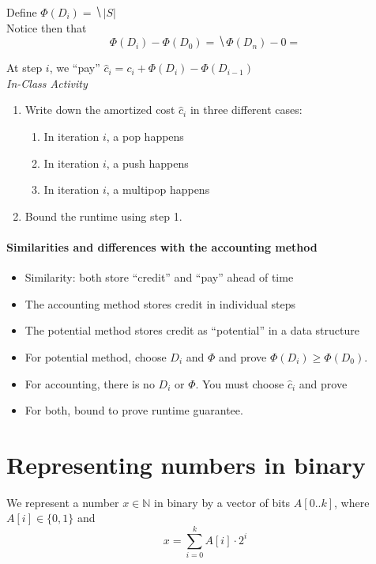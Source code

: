 \documentclass[11  pt]{article}
\begin{document}
Define $\Phi(D_i) = \hide{|S|}$ \\

Notice then that 
$$\Phi(D_i) - \Phi(D_0) =  \hide{\Phi(D_n) - 0 = } $$

At step $i$, we ``pay'' $\hat{c}_i = c_i + \Phi(D_i) - \Phi(D_{i-1})$\\


\emph{In-Class Activity}
\begin{enumerate}
	\item Write down the amortized cost $\hat{c}_i$ in three different cases: 
	\begin{enumerate}
		\item In iteration $i$, a pop happens
		\item In iteration $i$, a push happens
		\item In iteration $i$, a multipop happens
	\end{enumerate}
	\item Bound the runtime using step 1.
\end{enumerate}



\pagebreak
\paragraph{Similarities and differences with the accounting method}
\begin{itemize}
	\item Similarity: both store ``credit'' and ``pay'' ahead of time
	\item The accounting method stores credit in individual steps %
	\item The potential method stores credit as ``potential'' in a data structure
	\item For potential method, choose $D_i$ and $\Phi$ and prove $\Phi(D_i) \geq \Phi(D_0)$. \\
	\item For accounting, there is no $D_i$ or $\Phi$. You must choose $\hat{c}_i$ and prove 
	\item For both, bound  to prove runtime guarantee.
\end{itemize}

\pagebreak

\section{Representing numbers in binary}
We represent a number $x \in \mathbb{N}$ in binary by a vector of bits $A[0..k]$, where $A[i] \in \{0,1\}$ and
\begin{equation*}
	x = \sum_{i = 0}^k  A[i] \cdot 2^i
\end{equation*}
\end{document}
